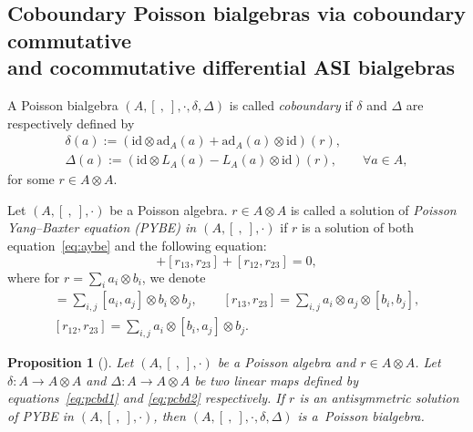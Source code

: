 \documentclass[10pt,a4paper]{amsart}
\numberwithin{equation}{section}
\newtheorem{Proposition}[Theorem]{Proposition}
{ \theoremstyle{definition}
	\newtheorem{Definition}[Theorem]{Definition}
	\newtheorem{Note}[Theorem]{Note}
	\newtheorem{Example}[Theorem]{Example}
	\newtheorem{Remark}[Theorem]{Remark} }
\newcommand{\ad}{\mathrm{ad}}
\newcommand{\id}{\mathrm{id}}
\begin{document}
\subsection[Coboundary Poisson bialgebras via coboundary commutative and cocommutative differential ASI bialgebras]{Coboundary Poisson bialgebras via coboundary commutative\\ and cocommutative differential ASI bialgebras}

\begin{Definition}
 A Poisson bialgebra $(A, [\ ,\ ], \cdot, \delta, \Delta)$ is called \textit{coboundary}
 if $\delta$ and $\Delta$ are respectively defined by
	\begin{gather}
 \delta(a) := (\id \otimes \ad_A(a) + \ad_A(a) \otimes \id )(r), \label{eq:pcbd1}\\
 \Delta(a) := (\id \otimes L_A(a) - L_A(a) \otimes \id)(r), \qquad \forall a \in A,\label{eq:pcbd2}
 \end{gather}
for some $r \in A \otimes A$.
\end{Definition}

\begin{Definition}
 Let $(A, [\ ,\ ], \cdot)$ be a Poisson algebra.
 $r \in A \otimes A$ is called a solution of \textit{Poisson Yang--Baxter equation (PYBE) in $(A, [\ ,\ ], \cdot)$} if $r$ is a solution of both equation~\eqref{eq:aybe} and the following equation:
 \begin{equation}
 [r_{12}, r_{13}] + [r_{13}, r_{23}] + [r_{12}, r_{23}] = 0, \label{eq:CYBE}
 \end{equation}
 where for $r = \sum_i a_i \otimes b_i$, we denote
 \begin{gather*}
 [r_{12}, r_{13}] = \sum_{i,j} [a_i, a_j] \otimes b_i \otimes b_j, \qquad
 [r_{13}, r_{23}] = \sum_{i,j} a_i \otimes a_j \otimes [b_i, b_j], \\
 [r_{12},r_{23}] = \sum_{i,j} a_i \otimes [b_i, a_j] \otimes b_j.
 \end{gather*}
\end{Definition}

\begin{Proposition}[{\cite[Theorem~2]{ni2013poisson}}]\label{pro:pybebi}
Let $(A, [\ ,\ ], \cdot)$ be a Poisson algebra and $r \in A \otimes A$.
 Let $\delta\colon A \to A \otimes A$ and $\Delta\colon A \to A \otimes A$ be two linear maps defined by equations~\eqref{eq:pcbd1} and \eqref{eq:pcbd2} respectively.
 If $r$ is an antisymmetric solution of PYBE in $(A, [\ ,\ ], \cdot)$,
 then $(A, [\ ,\ ], \cdot, \delta, \Delta)$ is a~Poisson bialgebra.
\end{Proposition}
\end{document}
